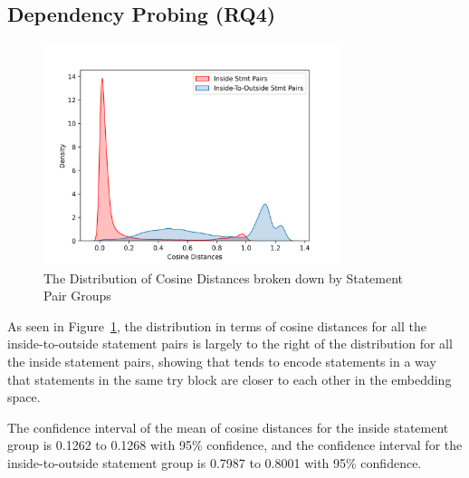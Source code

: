 \subsection{Dependency Probing (RQ4)}
\label{sec:rq4}

\begin{figure}[t]
 	\centering
 	\includegraphics[width=3.4in]{rq4-density.png}
        \vspace{-20pt}
 	\caption{The Distribution of Cosine Distances broken down by Statement Pair Groups}
 	\label{fig:rq4-density}	
\end{figure}

As seen in Figure~\ref{fig:rq4-density}, the distribution in terms of cosine distances for all the inside-to-outside statement pairs is largely to the right of the distribution for all the inside statement pairs, showing that {\tool} tends to encode statements in a way that statements in the same try block are closer to each other in the embedding space. 

The confidence interval of the mean of cosine distances for the inside statement group is 0.1262 to 0.1268 with 95\% confidence, and the confidence interval for the inside-to-outside statement group is 0.7987 to 0.8001 with 95\% confidence.
